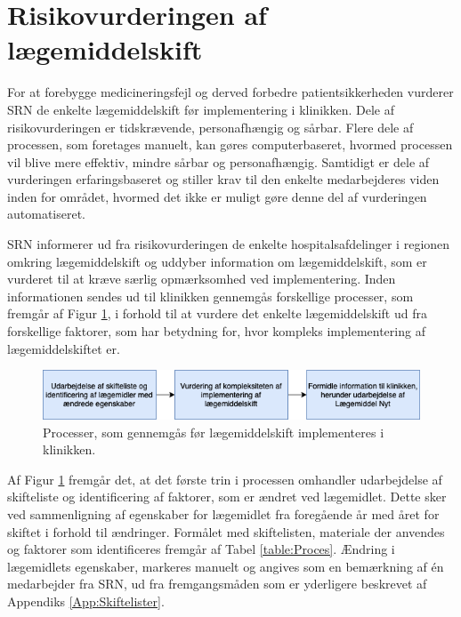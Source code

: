 \section{Risikovurderingen af lægemiddelskift} \label{sec:ImpLaeg}
For at forebygge medicineringsfejl og derved forbedre patientsikkerheden vurderer SRN de enkelte lægemiddelskift før implementering i klinikken. Dele af risikovurderingen er tidskrævende, personafhængig og sårbar. Flere dele af processen, som foretages manuelt, kan gøres computerbaseret, hvormed processen vil blive mere effektiv, mindre sårbar og personafhængig. Samtidigt er dele af vurderingen erfaringsbaseret og stiller krav til den enkelte medarbejderes viden inden for området, hvormed det ikke er muligt gøre denne del af vurderingen automatiseret.

SRN informerer ud fra risikovurderingen de enkelte hospitalsafdelinger i regionen omkring lægemiddelskift og uddyber information om lægemiddelskift, som er vurderet til at kræve særlig opmærksomhed ved implementering. Inden informationen sendes ud til klinikken gennemgås forskellige processer, som fremgår af Figur \ref{fig:Proces}, i forhold til at vurdere det enkelte lægemiddelskift ud fra forskellige faktorer, som har betydning for, hvor kompleks implementering af lægemiddelskiftet er. 

\begin{figure}[H]\centering	\includegraphics[width=1\textwidth]{billeder/proces.png} 
	\caption{Processer, som gennemgås før lægemiddelskift implementeres i klinikken.}\label{fig:Proces}  
\end{figure}

Af Figur \ref{fig:Proces} fremgår det, at det første trin i processen omhandler udarbejdelse af skifteliste og identificering af faktorer, som er ændret ved lægemidlet. Dette sker ved sammenligning af egenskaber for lægemidlet fra foregående år med året for skiftet i forhold til ændringer. Formålet med skiftelisten, materiale der anvendes og faktorer som identificeres fremgår af Tabel \ref{table:Proces}. Ændring i lægemidlets egenskaber, markeres manuelt og angives som en bemærkning af én medarbejder fra SRN, ud fra fremgangsmåden som er yderligere beskrevet af Appendiks \ref{App:Skiftelister}.

